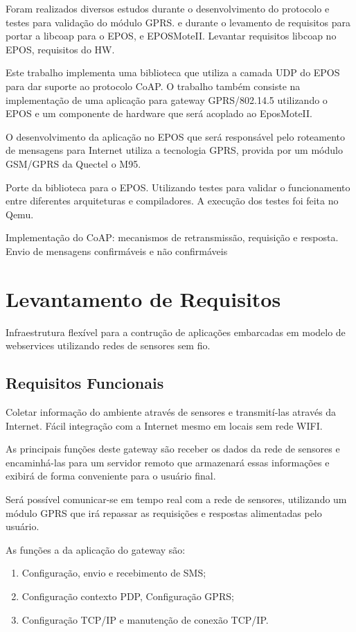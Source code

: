 Foram realizados diversos estudos durante o desenvolvimento do protocolo e testes para valida\c{c}\~ao do m\'odulo GPRS. e durante o levamento de requisitos para portar a libcoap para o EPOS, e EPOSMoteII. Levantar requisitos libcoap no EPOS, requisitos do HW.

Este trabalho implementa uma biblioteca que utiliza a camada UDP do EPOS para dar suporte ao protocolo CoAP. O trabalho tamb\'em consiste na implementa\c{c}\~ao de uma aplica\c{c}\~ao para gateway GPRS/802.14.5 utilizando o EPOS e um componente de hardware que ser\'a acoplado ao EposMoteII.

O desenvolvimento da aplica\c{c}\~ao no EPOS que ser\'a respons\'avel pelo roteamento de mensagens para Internet utiliza a tecnologia GPRS, provida por um m\'odulo GSM/GPRS da Quectel o M95.

Porte da biblioteca para o EPOS. Utilizando testes para validar o funcionamento entre diferentes arquiteturas e compiladores. A execu\c{c}\~ao dos testes foi feita no Qemu.

Implementa\c{c}\~ao do CoAP: mecanismos de retransmiss\~ao, requisi\c{c}\~ao e resposta. Envio de mensagens confirm\'aveis e n\~ao confirm\'aveis

\section{Levantamento de Requisitos}
Infraestrutura flex\'ivel para a contru\c{c}\~ao de aplica\c{c}\~oes embarcadas em modelo de webservices utilizando redes de sensores sem fio.

\subsection{Requisitos Funcionais}
Coletar informa\c{c}\~ao do ambiente atrav\'es de sensores e transmit\'i-las atrav\'es da Internet. F\'acil integra\c{c}\~ao com a Internet mesmo em locais sem rede WIFI.

As principais fun\c{c}\~oes deste gateway s\~ao receber os dados da rede de sensores e encaminh\'a-las para um servidor remoto que armazenar\'a essas informa\c{c}\~oes e exibir\'a de forma conveniente para o usu\'ario final.

Ser\'a poss\'ivel comunicar-se em tempo real com a rede de sensores, utilizando um m\'odulo GPRS que ir\'a repassar as requisi\c{c}\~oes e respostas alimentadas pelo usu\'ario.

As fun\c{c}\~oes a da aplica\c{c}\~ao do gateway s\~ao:
\begin{enumerate}
    \item Configura\c{c}\~ao, envio e recebimento de SMS;
    \item Configura\c{c}\~ao contexto PDP, Configura\c{c}\~ao GPRS;
    \item Configura\c{c}\~ao TCP/IP e manuten\c{c}\~ao de conex\~ao TCP/IP.
\end{enumerate}

